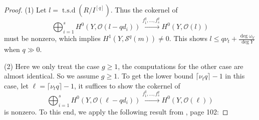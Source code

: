 \documentclass[draft]{amsart}
\theoremstyle{definition}
\numberwithin{equation}{theorem}
\begin{document}
\begin{proof}
(1) Let $l= {\operatorname{t.s.d}} (R/I^{[q]})$. Thus the cokernel of 
\[\bigoplus_{i=1}^sH^0(Y, {\mathcal{O}}(l-qd_i)) \stackrel{f_1^q
, \ldots, f_s^q} {\longrightarrow} H^0(Y, {\mathcal{O}}(l))\]
must be nonzero, which implies $ H^1(Y, {\mathcal{S}}^q(m)) \neq 0$. This shows $l \leq q\nu_t+\frac{\deg \omega_Y}{\deg Y}$ when $q\gg0$. 

(2) Here we only treat the case $g\geq1$, the computations for the other case are almost identical. So we assume $g\geq 1$. 
To get the lower bound ${{\lceil}}\nu_t q{{\rceil}}-1$ in this case, let  ${\ell}={{\lceil}}\nu_t q{{\rceil}}-1$, it suffices to show the cokernel of 
\[\bigoplus_{i=1}^sH^0(Y, {\mathcal{O}}({\ell}-qd_i)) \stackrel{f_1^q
, \ldots, f_s^q} {\longrightarrow} H^0(Y, {\mathcal{O}}({\ell}))\]
is nonzero. To this end, we apply the following result from \cite{B2}, page 102:


\end{proof}
\end{document}
